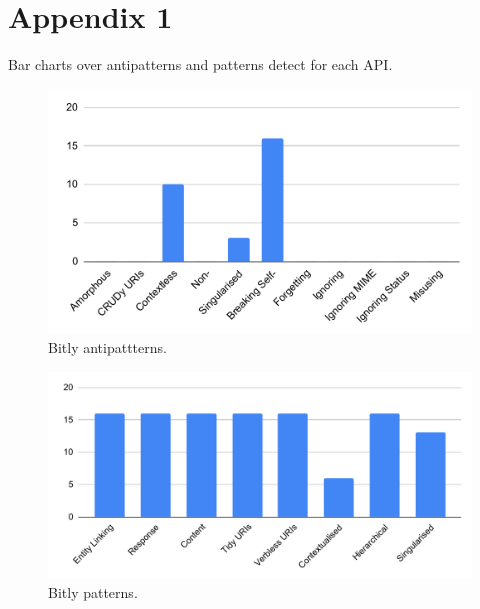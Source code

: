\documentclass[a4paper,12pt]{article}
\begin{document}
\section{Appendix 1} 

Bar charts over antipatterns and patterns detect for each API.

\begin{figure}[!h]
\begin{center}
\includegraphics[keepaspectratio,scale=0.8]{Template_report_LaTeX_EN/img/barchart/bitlyBarAnti.pdf}
\caption{Bitly antipattterns.}
\label{fig:bitlyBarAnti}
\end{center}
\end{figure}

\begin{figure}[!h]
\begin{center}
\includegraphics[keepaspectratio,scale=0.8]{Template_report_LaTeX_EN/img/barchart/bitlyBarPatt.pdf}
\caption{Bitly patterns.}
\label{fig:bitlyBarPatt}
\end{center}
\end{figure}
\end{document}
